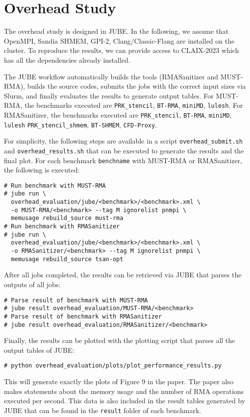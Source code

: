\documentclass[twoside]{article}
\begin{document}
\section*{Overhead Study}
The overhead study is designed in JUBE.
In the following, we assume that OpenMPI, Sandia SHMEM, GPI-2, Clang/Classic-Flang are installed on the cluster.
To reproduce the results, we can provide access to CLAIX-2023 which has all the dependencies already installed.

The JUBE workflow automatically builds the tools (RMASanitizer and MUST-RMA), builds the source codes, submits the jobs with the correct input sizes via Slurm, and finally evaluates the results to generate output tables.
For MUST-RMA, the benchmarks executed are \texttt{PRK\_stencil}, \texttt{BT-RMA}, \texttt{miniMD}, \texttt{lulesh}.
For RMASanitizer, the benchmarks executed are \texttt{PRK\_stencil}, \texttt{BT-RMA},  \texttt{miniMD}, \texttt{lulesh} \texttt{PRK\_stencil\_shmem}, \texttt{BT-SHMEM}, \texttt{CFD-Proxy}.

For simplicity, the following steps are available in a script \texttt{overhead\_submit.sh} and \texttt{overhead\_results.sh} that can be executed to generate the results and the final plot.
For each benchmark \texttt{benchname} with MUST-RMA or RMASanitizer, the following is executed:

{
\small
\begin{verbatim}
# Run benchmark with MUST-RMA
# jube run \
  overhead_evaluation/jube/<benchmark>/<benchmark>.xml \
  -o MUST-RMA/<benchmark> --tag M ignorelist pnmpi \ 
  memusage rebuild_source must-rma
# Run benchmark with RMASanitizer
# jube run \
  overhead_evaluation/jube/<benchmark>/<benchmark>.xml \
  -o RMASanitizer/<benchmark> --tag M ignorelist pnmpi \ 
  memusage rebuild_source tsan-opt
\end{verbatim}
}

After all jobs completed, the results can be retrieved via JUBE that parses the outputs of all jobs:

{
\small
\begin{verbatim}
# Parse result of benchmark with MUST-RMA
# jube result overhead_evaluation/MUST-RMA/<benchmark>
# Parse result of benchmark with RMASanitizer
# jube result overhead_evaluation/RMASanitizer/<benchmark>
\end{verbatim}
}

Finally, the results can be plotted with the plotting script that parses all the output tables of JUBE:
{
\footnotesize
\begin{verbatim}
# python overhead_evaluation/plots/plot_performance_results.py
\end{verbatim}
}

This will generate exactly the plots of Figure 9 in the paper. The paper also makes statements about the memory usage and the number of RMA operations executed per second. This data is also included in the result tables generated by JUBE that can be found in the \texttt{result} folder of each benchmark.
\end{document}
